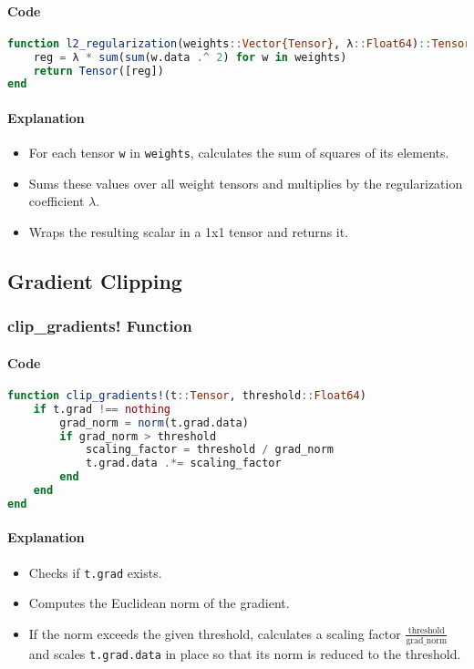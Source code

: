 \documentclass[11pt]{article}
\begin{document}
\paragraph{Code}
\begin{lstlisting}[language=Julia]
function l2_regularization(weights::Vector{Tensor}, λ::Float64)::Tensor
    reg = λ * sum(sum(w.data .^ 2) for w in weights)
    return Tensor([reg])
end
\end{lstlisting}

\paragraph{Explanation}
\begin{itemize}
    \item For each tensor \texttt{w} in \texttt{weights}, calculates the sum of squares of its elements.
    \item Sums these values over all weight tensors and multiplies by the regularization coefficient \( \lambda \).
    \item Wraps the resulting scalar in a 1x1 tensor and returns it.
\end{itemize}

\subsection{Gradient Clipping}
\subsubsection{clip\_gradients! Function}
\paragraph{Code}
\begin{lstlisting}[language=Julia]
function clip_gradients!(t::Tensor, threshold::Float64)
    if t.grad !== nothing
        grad_norm = norm(t.grad.data)
        if grad_norm > threshold
            scaling_factor = threshold / grad_norm
            t.grad.data .*= scaling_factor
        end
    end
end
\end{lstlisting}

\paragraph{Explanation}
\begin{itemize}
    \item Checks if \texttt{t.grad} exists.
    \item Computes the Euclidean norm of the gradient.
    \item If the norm exceeds the given threshold, calculates a scaling factor \( \frac{\text{threshold}}{\text{grad\_norm}} \) and scales \texttt{t.grad.data} in place so that its norm is reduced to the threshold.
\end{itemize}
\end{document}
